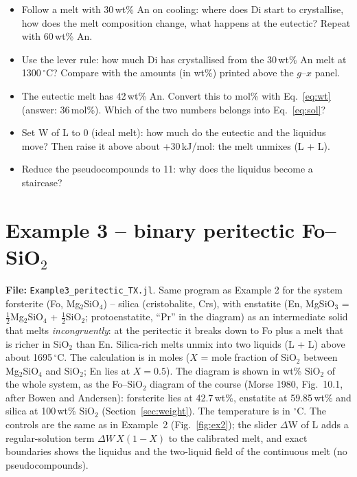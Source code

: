 \documentclass[11pt,a4paper]{article}
\newcommand{\ctl}[1]{\textsf{#1}}                              %
\newcommand{\file}[1]{\texttt{#1}}
\begin{document}
\begin{tryit}
\begin{itemize}
\item Follow a melt with 30\,wt\% An on cooling: where does Di start to crystallise, how does the melt
  composition change, what happens at the eutectic? Repeat with 60\,wt\% An.
\item Use the lever rule: how much Di has crystallised from the 30\,wt\% An melt at 1300\,$^\circ$C? Compare with
  the amounts (in wt\%) printed above the $g$–$x$ panel.
\item The eutectic melt has 42\,wt\% An. Convert this to mol\% with Eq.~\eqref{eq:wt} (answer: 36\,mol\%).
  Which of the two numbers belongs into Eq.~\eqref{eq:sol}?
\item Set \ctl{W of L} to 0 (ideal melt): how much do the eutectic and the liquidus move? Then raise it above
  about +30\,kJ/mol: the melt unmixes (L + L).
\item Reduce the pseudocompounds to 11: why does the liquidus become a staircase?
\end{itemize}
\end{tryit}

\clearpage
\section{Example 3 – binary peritectic Fo–SiO\texorpdfstring{$_2$}{2}}\label{sec:ex3}
\textbf{File:} \file{Example3\_peritectic\_TX.jl}.\quad
Same program as Example 2 for the system forsterite (Fo, Mg$_2$SiO$_4$) – silica (cristobalite, Crs), with
enstatite (En, MgSiO$_3$ = $\tfrac12$Mg$_2$SiO$_4$ + $\tfrac12$SiO$_2$; protoenstatite, ``Pr'' in the diagram)
as an intermediate solid that melts \emph{incongruently}: at the peritectic it breaks down to Fo plus a melt
that is richer in SiO$_2$ than En. Silica-rich melts unmix into two liquids (L + L) above about
1695\,$^\circ$C. The calculation is in moles ($X$ = mole fraction of SiO$_2$ between Mg$_2$SiO$_4$ and
SiO$_2$; En lies at $X = 0.5$). The diagram is shown in wt\% SiO$_2$ of the whole system, as the Fo–SiO$_2$
diagram of the course (Morse 1980, Fig.~10.1, after Bowen and Andersen): forsterite lies at 42.7\,wt\%,
enstatite at 59.85\,wt\% and silica at 100\,wt\% SiO$_2$ (Section~\ref{sec:weight}). The temperature is in
$^\circ$C. The controls are the same as in Example~2 (Fig.~\ref{fig:ex2}); the slider \ctl{$\Delta$W of L}
adds a regular-solution term $\Delta W\,X(1-X)$ to the calibrated melt, and \ctl{exact boundaries} shows
the liquidus and the two-liquid field of the continuous melt (no pseudocompounds).
\end{document}
